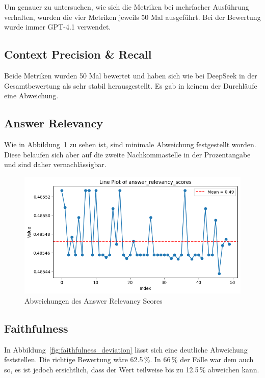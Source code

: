 Um genauer zu untersuchen, wie sich die Metriken bei mehrfacher Ausführung verhalten, wurden die vier Metriken jeweils 50 Mal ausgeführt.
Bei der Bewertung wurde immer GPT-4.1 verwendet.

\subsection{Context Precision \& Recall}
Beide Metriken wurden 50 Mal bewertet und haben sich wie bei DeepSeek in der Gesamtbewertung als sehr stabil herausgestellt. Es gab in keinem der Durchläufe eine Abweichung.

\subsection{Answer Relevancy}
Wie in Abbildung~\ref{fig:answer_relevancy_deviation} zu sehen ist, sind minimale Abweichung festgestellt worden.
Diese belaufen sich aber auf die zweite Nachkommastelle in der Prozentangabe und sind daher vernachlässigbar.

\begin{figure}[ht!]
    \centering
    \includegraphics[width=1\textwidth]{images/answer_relevancy.png}
    \caption{Abweichungen des Answer Relevancy Scores}
    \label{fig:answer_relevancy_deviation}
\end{figure}

\subsection{Faithfulness}
In Abbildung~\ref{fig:faithfulness_deviation} lässt sich eine deutliche Abweichung feststellen. Die richtige Bewertung wäre 62.5\,\%. In 66\,\% der Fälle war dem auch so, es ist jedoch ersichtlich, dass der Wert teilweise bis zu 12.5\,\% abweichen kann.

